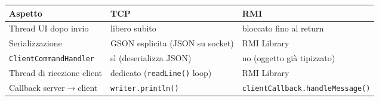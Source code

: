\documentclass[11pt,a4paper]{article}
\begin{document}
\begin{center}
\begin{tabular}{|l|l|l|}
\hline
\textbf{Aspetto} & \textbf{TCP} & \textbf{RMI} \\
\hline
Thread UI dopo invio & libero subito & bloccato fino al return \\
Serializzazione & GSON esplicita (JSON su socket) & RMI Library \\
\texttt{ClientCommandHandler} & sì (deserializza JSON) & no (oggetto già tipizzato) \\
Thread di ricezione client & dedicato (\texttt{readLine()} loop) & RMI Library\\
Callback server$\to$client & \texttt{writer.println()} & \texttt{clientCallback.handleMessage()} \\
\hline
\end{tabular}
\end{center}
\end{document}
